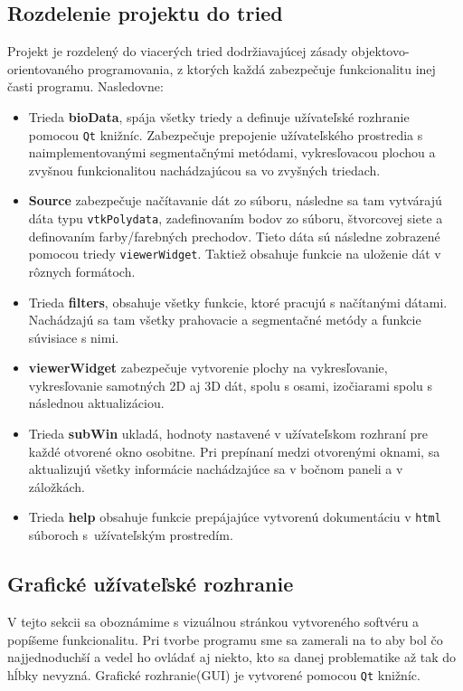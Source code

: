 \documentclass[a4paper,11pt,oneside]{article}%
\begin{document}
\subsection{Rozdelenie projektu do tried}
Projekt je rozdelený do viacerých tried dodržiavajúcej zásady objektovo-o\-rien\-to\-va\-né\-ho programovania, z ktorých každá zabezpečuje funkcionalitu inej časti programu. Nasledovne:

\begin{itemize}
\item Trieda \textbf{bioData}, spája všetky triedy a definuje užívateľské rozhranie pomocou \texttt{Qt} knižníc. Zabezpečuje prepojenie užívateľského prostredia s naimplementovanými segmentačnými metódami, vykresľovacou plochou a zvyšnou funkcionalitou nachádzajúcou sa vo zvyšných triedach. 
\item \textbf{Source} zabezpečuje načítavanie dát zo súboru, následne sa tam vytvárajú dáta typu \texttt{vtkPolydata}, zadefinovaním bodov zo súboru, štvorcovej siete a definovaním farby/fa\-reb\-ných prechodov. Tieto dáta sú následne zobrazené pomocou triedy \texttt{viewerWidget}. Taktiež obsahuje funkcie na uloženie dát v rôznych formátoch.    
\item Trieda \textbf{filters}, obsahuje všetky funkcie, ktoré pracujú s načítanými dátami. Nachádzajú sa tam všetky prahovacie a segmentačné metódy a funkcie súvisiace s nimi.
\item \textbf{viewerWidget} zabezpečuje vytvorenie plochy na vykresľovanie, vykresľovanie samotných 2D aj 3D dát, spolu s osami, izočiarami spolu s následnou aktualizáciou. 
\item Trieda \textbf{subWin} ukladá, hodnoty nastavené v užívateľskom rozhraní pre každé otvorené okno osobitne. Pri prepínaní medzi otvorenými oknami, sa aktualizujú všetky informácie nachádzajúce sa v bočnom paneli a v záložkách. 
\item Trieda \textbf{help} obsahuje funkcie prepájajúce vytvorenú dokumentáciu v \texttt{html} súboroch s~užívateľským prostredím.
\end{itemize}

\subsection{Grafické užívateľské rozhranie}

V tejto sekcii sa oboznámime s vizuálnou stránkou vytvoreného softvéru a popíšeme funkcionalitu. Pri tvorbe programu sme sa zamerali na to aby bol čo najjednoduchší a vedel ho ovládať aj niekto, kto sa danej problematike až tak do hĺbky nevyzná. Grafické rozhranie(GUI) je vytvorené pomocou \texttt{Qt} knižníc.
\end{document}
